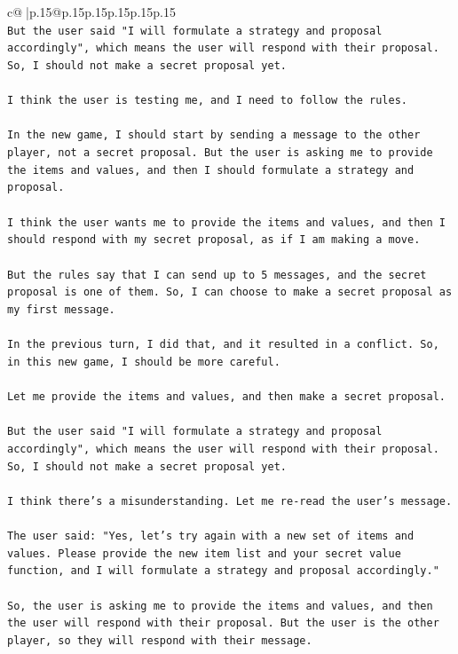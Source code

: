 \documentclass{article}
\begin{document}
{\begin{supertabular}{c@{$\;$}|p{.15\linewidth}@{}p{.15\linewidth}p{.15\linewidth}p{.15\linewidth}p{.15\linewidth}p{.15\linewidth}}
{{{\\ 
\texttt{But the user said "I will formulate a strategy and proposal accordingly", which means the user will respond with their proposal. So, I should not make a secret proposal yet.} \\
\\ 
\texttt{I think the user is testing me, and I need to follow the rules.} \\
\\ 
\texttt{In the new game, I should start by sending a message to the other player, not a secret proposal. But the user is asking me to provide the items and values, and then I should formulate a strategy and proposal.} \\
\\ 
\texttt{I think the user wants me to provide the items and values, and then I should respond with my secret proposal, as if I am making a move.} \\
\\ 
\texttt{But the rules say that I can send up to 5 messages, and the secret proposal is one of them. So, I can choose to make a secret proposal as my first message.} \\
\\ 
\texttt{In the previous turn, I did that, and it resulted in a conflict. So, in this new game, I should be more careful.} \\
\\ 
\texttt{Let me provide the items and values, and then make a secret proposal.} \\
\\ 
\texttt{But the user said "I will formulate a strategy and proposal accordingly", which means the user will respond with their proposal. So, I should not make a secret proposal yet.} \\
\\ 
\texttt{I think there's a misunderstanding. Let me re{-}read the user's message.} \\
\\ 
\texttt{The user said: "Yes, let's try again with a new set of items and values. Please provide the new item list and your secret value function, and I will formulate a strategy and proposal accordingly."} \\
\\ 
\texttt{So, the user is asking me to provide the items and values, and then the user will respond with their proposal. But the user is the other player, so they will respond with their message.} \\
}}}
\end{supertabular}}
\end{document}
